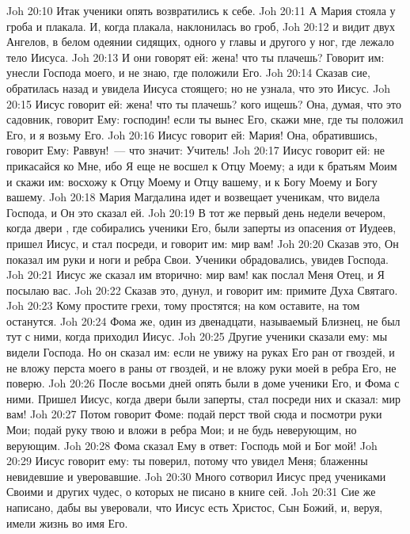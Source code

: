 \vs Joh 20:10 Итак ученики опять возвратились к себе.
\rsbpar\vs Joh 20:11 А Мария стояла у гроба и плакала. И, когда плакала, наклонилась во гроб,
\vs Joh 20:12 и видит двух Ангелов, в белом одеянии сидящих, одного у главы и другого у ног, где лежало тело Иисуса.
\vs Joh 20:13 И они говорят ей: жена! что ты плачешь? Говорит им: унесли Господа моего, и не знаю, где положили Его.
\vs Joh 20:14 Сказав сие, обратилась назад и увидела Иисуса стоящего; но не узнала, что это Иисус.
\vs Joh 20:15 Иисус говорит ей: жена! что ты плачешь? кого ищешь? Она, думая, что это садовник, говорит Ему: господин! если ты вынес Его, скажи мне, где ты положил Его, и я возьму Его.
\vs Joh 20:16 Иисус говорит ей: Мария! Она, обратившись, говорит Ему: Раввун!~--- что значит: Учитель!
\vs Joh 20:17 Иисус говорит ей: не прикасайся ко Мне, ибо Я еще не восшел к Отцу Моему; а иди к братьям Моим и скажи им: восхожу к Отцу Моему и Отцу вашему, и к Богу Моему и Богу вашему.
\vs Joh 20:18 Мария Магдалина идет и возвещает ученикам, что видела Господа, и  Он это сказал ей.
\rsbpar\vs Joh 20:19 В тот же первый день недели вечером, когда двери , где собирались ученики Его, были заперты из опасения от Иудеев, пришел Иисус, и стал посреди, и говорит им: мир вам!
\vs Joh 20:20 Сказав это, Он показал им руки и ноги и ребра Свои. Ученики обрадовались, увидев Господа.
\vs Joh 20:21 Иисус же сказал им вторично: мир вам! как послал Меня Отец,  и Я посылаю вас.
\vs Joh 20:22 Сказав это, дунул, и говорит им: примите Духа Святаго.
\vs Joh 20:23 Кому простите грехи, тому простятся; на ком оставите, на том останутся.
\vs Joh 20:24 Фома же, один из двенадцати, называемый Близнец, не был тут с ними, когда приходил Иисус.
\vs Joh 20:25 Другие ученики сказали ему: мы видели Господа. Но он сказал им: если не увижу на руках Его ран от гвоздей, и не вложу перста моего в раны от гвоздей, и не вложу руки моей в ребра Его, не поверю.
\rsbpar\vs Joh 20:26 После восьми дней опять были в доме ученики Его, и Фома с ними. Пришел Иисус, когда двери были заперты, стал посреди них и сказал: мир вам!
\vs Joh 20:27 Потом говорит Фоме: подай перст твой сюда и посмотри руки Мои; подай руку твою и вложи в ребра Мои; и не будь неверующим, но верующим.
\vs Joh 20:28 Фома сказал Ему в ответ: Господь мой и Бог мой!
\vs Joh 20:29 Иисус говорит ему: ты поверил, потому что увидел Меня; блаженны невидевшие и уверовавшие.
\rsbpar\vs Joh 20:30 Много сотворил Иисус пред учениками Своими и других чудес, о которых не писано в книге сей.
\vs Joh 20:31 Сие же написано, дабы вы уверовали, что Иисус есть Христос, Сын Божий, и, веруя, имели жизнь во имя Его.

